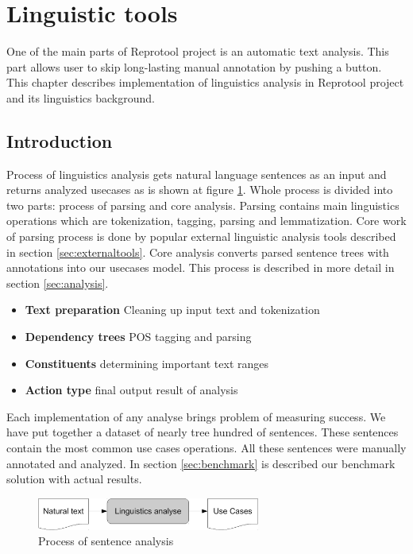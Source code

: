 \section{Linguistic tools}

One of the main parts of Reprotool project is an automatic text analysis. This part allows user to skip long-lasting manual annotation by pushing a button. This chapter describes implementation of linguistics analysis in Reprotool project and its linguistics background.

\subsection{Introduction}
Process of linguistics analysis gets natural language sentences as an input and returns analyzed usecases as is shown at figure \ref{fig:LinguisticsAnalyseSmall}. Whole process is divided into two parts: process of parsing and core analysis. Parsing contains main linguistics operations which are tokenization, tagging, parsing and lemmatization. Core work of parsing process is done by popular external linguistic analysis tools described in section \ref{sec:externaltools}. Core analysis converts parsed sentence trees with annotations into our usecases model. This process is described in more detail in section \ref{sec:analysis}. %

\begin{itemize}
\item {\bf Text preparation} Cleaning up input text and tokenization
\item {\bf Dependency trees} POS tagging and parsing
\item {\bf Constituents} determining important text ranges
\item {\bf Action type} final output result of analysis
\end{itemize}

Each implementation of any analyse brings problem of measuring success. We have put together a dataset of nearly tree hundred of sentences. These sentences contain the most common use cases operations. All these sentences were manually annotated and analyzed. In section \ref{sec:benchmark} is described our benchmark solution with actual results.

\begin{figure}[ht]
  \centering
  \includegraphics[height=30pt]{images/LinguisticsAnalyseSmall}
  \caption{Process of sentence analysis}
  \label{fig:LinguisticsAnalyseSmall}
\end{figure}

